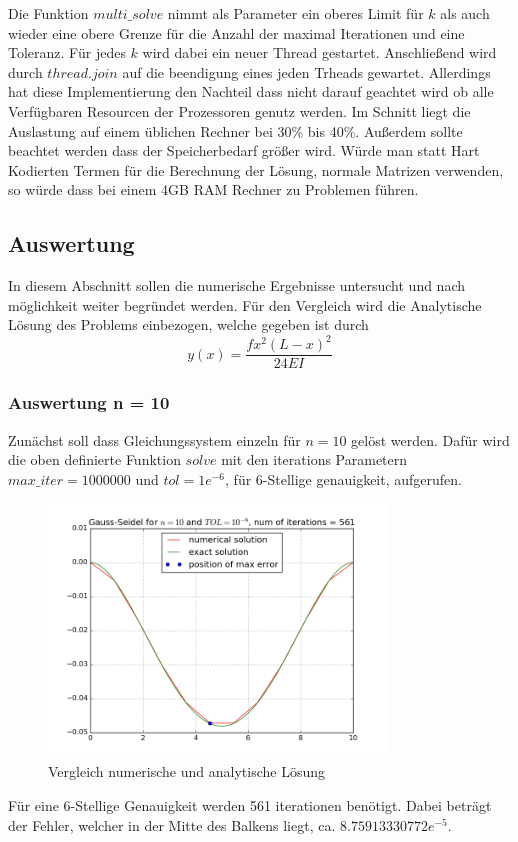 \documentclass[12pt,titlepage]{article}
\begin{document}
		\newline \newline
		Die Funktion $multi\_solve$	nimmt als Parameter ein oberes Limit für $k$ als auch wieder eine obere Grenze für die Anzahl der maximal Iterationen und eine Toleranz. Für jedes $k$ wird dabei ein neuer Thread gestartet. Anschließend wird durch $thread.join$ auf die beendigung eines jeden Trheads gewartet.
		Allerdings hat diese Implementierung den Nachteil dass nicht darauf geachtet wird ob alle Verfügbaren Resourcen der Prozessoren genutz werden. Im Schnitt liegt die Auslastung auf einem üblichen Rechner bei 30\% bis 40\%.
		Außerdem sollte beachtet werden dass der Speicherbedarf größer wird. Würde man statt Hart Kodierten Termen für die Berechnung der Lösung, normale Matrizen verwenden, so würde dass bei einem 4GB RAM Rechner zu Problemen führen.	
		
	\subsection{Auswertung}
		In diesem Abschnitt sollen die numerische Ergebnisse untersucht und nach möglichkeit weiter begründet werden.
		Für den Vergleich wird die Analytische Lösung des Problems einbezogen, welche gegeben ist durch
		\begin{equation}
			y(x) = \frac{fx^2(L-x)^2}{24EI}
		\end{equation}
		
		\newpage
		\subsubsection{Auswertung n = 10}
			Zunächst soll dass Gleichungssystem einzeln für $n=10$ gelöst werden. Dafür wird die oben definierte
		 	Funktion $solve$ mit den iterations Parametern $max\_iter=1000000$ und $tol=1e^{-6}$, für 6-Stellige genauigkeit, aufgerufen.
		 	
		 	\begin{figure}[H] 
	 			\centering
	 			\includegraphics[width=0.8\textwidth]{n_10.png}
	 			\caption{Vergleich numerische und analytische Lösung}
	 			\label{fig:Bild1}
	 		\end{figure}
	 		Für eine 6-Stellige Genauigkeit werden 561 iterationen benötigt. Dabei beträgt der Fehler, welcher in der Mitte des Balkens liegt, ca.
	 		$8.75913330772e^{-5}$.
	 	
\end{document}
